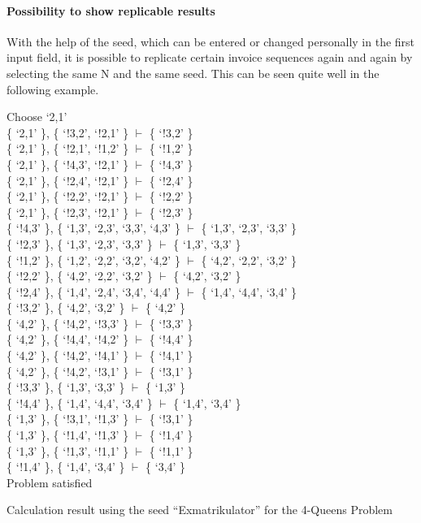 \paragraph{Possibility to show replicable results}
With the help of the seed, which can be entered or changed personally in the first input field, it is possible to replicate certain invoice sequences again and again by selecting the same N and the same seed. This can be seen quite well in the following example.
%
\begin{listing}
Choose `2,1'\\
\{ `2,1' \}, \{ `!3,2', `!2,1' \} $\vdash$ \{ `!3,2' \}\\
\{ `2,1' \}, \{ `!2,1', `!1,2' \} $\vdash$ \{ `!1,2' \}\\
\{ `2,1' \}, \{ `!4,3', `!2,1' \} $\vdash$ \{ `!4,3' \}\\
\{ `2,1' \}, \{ `!2,4', `!2,1' \} $\vdash$ \{ `!2,4' \}\\
\{ `2,1' \}, \{ `!2,2', `!2,1' \} $\vdash$ \{ `!2,2' \}\\
\{ `2,1' \}, \{ `!2,3', `!2,1' \} $\vdash$ \{ `!2,3' \}\\
\{ `!4,3' \}, \{ `1,3', `2,3', `3,3', `4,3' \} $\vdash$ \{ `1,3', `2,3', `3,3' \}\\
\{ `!2,3' \}, \{ `1,3', `2,3', `3,3' \} $\vdash$ \{ `1,3', `3,3' \}\\
\{ `!1,2' \}, \{ `1,2', `2,2', `3,2', `4,2' \} $\vdash$ \{ `4,2', `2,2', `3,2' \}\\
\{ `!2,2' \}, \{ `4,2', `2,2', `3,2' \} $\vdash$ \{ `4,2', `3,2' \}\\
\{ `!2,4' \}, \{ `1,4', `2,4', `3,4', `4,4' \} $\vdash$ \{ `1,4', `4,4', `3,4' \}\\
\{ `!3,2' \}, \{ `4,2', `3,2' \} $\vdash$ \{ `4,2' \}\\
\{ `4,2' \}, \{ `!4,2', `!3,3' \} $\vdash$ \{ `!3,3' \}\\
\{ `4,2' \}, \{ `!4,4', `!4,2' \} $\vdash$ \{ `!4,4' \}\\
\{ `4,2' \}, \{ `!4,2', `!4,1' \} $\vdash$ \{ `!4,1' \}\\
\{ `4,2' \}, \{ `!4,2', `!3,1' \} $\vdash$ \{ `!3,1' \}\\
\{ `!3,3' \}, \{ `1,3', `3,3' \} $\vdash$ \{ `1,3' \}\\
\{ `!4,4' \}, \{ `1,4', `4,4', `3,4' \} $\vdash$ \{ `1,4', `3,4' \}\\
\{ `1,3' \}, \{ `!3,1', `!1,3' \} $\vdash$ \{ `!3,1' \}\\
\{ `1,3' \}, \{ `!1,4', `!1,3' \} $\vdash$ \{ `!1,4' \}\\
\{ `1,3' \}, \{ `!1,3', `!1,1' \} $\vdash$ \{ `!1,1' \}\\
\{ `!1,4' \}, \{ `1,4', `3,4' \} $\vdash$ \{ `3,4' \}\\
Problem satisfied
    \caption{Calculation result using the seed ``Exmatrikulator'' for the 4-Queens Problem}
    \label{code:calcExN4}
\end{listing}
